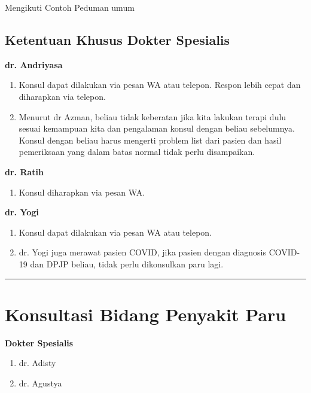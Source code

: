 \documentclass[
]{book}
\providecommand{\tightlist}{%
  \setlength{\itemsep}{0pt}\setlength{\parskip}{0pt}}
\begin{document}
Mengikuti Contoh Peduman umum

\hypertarget{ketentuan-khusus-dokter-spesialis}{%
\subsection{Ketentuan Khusus Dokter Spesialis}\label{ketentuan-khusus-dokter-spesialis}}

\textbf{dr. Andriyasa}

\begin{enumerate}
\def\labelenumi{\arabic{enumi}.}
\tightlist
\item
  Konsul dapat dilakukan via pesan WA atau telepon. Respon lebih cepat dan diharapkan via telepon.
\item
  Menurut dr Azman, beliau tidak keberatan jika kita lakukan terapi dulu sesuai kemampuan kita dan pengalaman konsul dengan beliau sebelumnya.
  Konsul dengan beliau harus mengerti problem list dari pasien dan hasil pemeriksaan yang dalam batas normal tidak perlu disampaikan.
\end{enumerate}

\textbf{dr. Ratih}

\begin{enumerate}
\def\labelenumi{\arabic{enumi}.}
\tightlist
\item
  Konsul diharapkan via pesan WA.
\end{enumerate}

\textbf{dr. Yogi}

\begin{enumerate}
\def\labelenumi{\arabic{enumi}.}
\tightlist
\item
  Konsul dapat dilakukan via pesan WA atau telepon.
\item
  dr. Yogi juga merawat pasien COVID, jika pasien dengan diagnosis COVID-19 dan DPJP beliau, tidak perlu dikonsulkan paru lagi.
\end{enumerate}

\begin{center}\rule{0.5\linewidth}{0.5pt}\end{center}

\hypertarget{konsultasi-bidang-penyakit-paru}{%
\section{Konsultasi Bidang Penyakit Paru}\label{konsultasi-bidang-penyakit-paru}}

\textbf{Dokter Spesialis}

\begin{enumerate}
\def\labelenumi{\arabic{enumi}.}
\tightlist
\item
  dr. Adisty
\item
  dr. Agustya
\end{enumerate}
\end{document}
